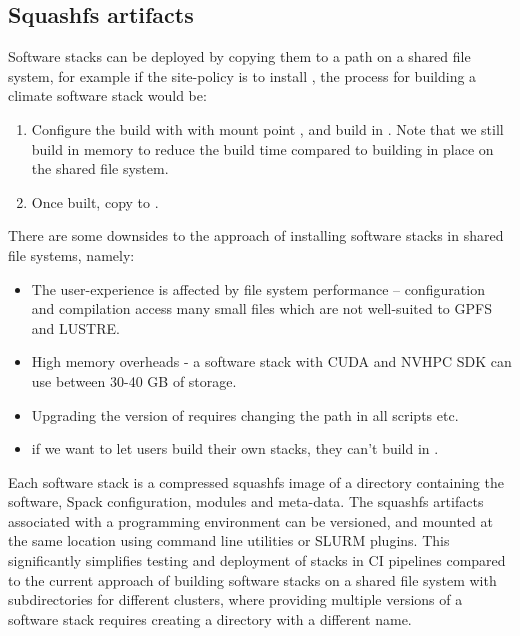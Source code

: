 \subsection{Squashfs artifacts}

Software stacks can be deployed by copying them to a path on a shared file system, for example if the site-policy is to install , the process for building a climate software stack  would be:
\begin{enumerate}
    \item Configure the build with  with mount point , and build in .
        Note that we still build in memory to reduce the build time compared to building in place on the shared file system.
    \item Once built, copy  to .
\end{enumerate}

There are some downsides to the approach of installing software stacks in shared file systems, namely:
\begin{itemize}
    \item The user-experience is affected by file system performance -- configuration and compilation access many small files which are not well-suited to GPFS and LUSTRE.
    \item High memory overheads - a software stack with CUDA and NVHPC SDK can use between 30-40 GB of storage.
    \item Upgrading the version of requires changing the path in all scripts etc.
    \item if we want to let users build their own stacks, they can't build in .
\end{itemize}

Each software stack is a compressed squashfs image of a directory containing the software, Spack configuration, modules and meta-data.
The squashfs artifacts associated with a programming environment can be versioned, and mounted at the same location using command line utilities or SLURM plugins.
This significantly simplifies testing and deployment of stacks in CI pipelines compared to the current approach of building software stacks on a shared file system with subdirectories for different clusters, where providing multiple versions of a software stack requires creating a directory with a different name.

